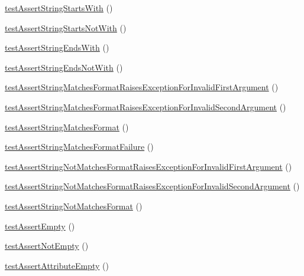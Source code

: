 \begin{DoxyCompactItemize}
\item 
\mbox{\hyperlink{class_framework___assert_test_a7d29d1df44885e798318e63969d1c641}{test\+Assert\+String\+Starts\+With}} ()
\item 
\mbox{\hyperlink{class_framework___assert_test_a78bd8e91d4107a55c53d96343f54780f}{test\+Assert\+String\+Starts\+Not\+With}} ()
\item 
\mbox{\hyperlink{class_framework___assert_test_ab0f2497729bc21b4f7c3b5fb893cfe00}{test\+Assert\+String\+Ends\+With}} ()
\item 
\mbox{\hyperlink{class_framework___assert_test_ad4c2782c2bafb3fdfa97ca4935772844}{test\+Assert\+String\+Ends\+Not\+With}} ()
\item 
\mbox{\hyperlink{class_framework___assert_test_a7b533de2baf506431848208788821702}{test\+Assert\+String\+Matches\+Format\+Raises\+Exception\+For\+Invalid\+First\+Argument}} ()
\item 
\mbox{\hyperlink{class_framework___assert_test_aa71b27deb1167ac44665bb6a043e0dc6}{test\+Assert\+String\+Matches\+Format\+Raises\+Exception\+For\+Invalid\+Second\+Argument}} ()
\item 
\mbox{\hyperlink{class_framework___assert_test_a9b2db252f130a595084a01c466e571cd}{test\+Assert\+String\+Matches\+Format}} ()
\item 
\mbox{\hyperlink{class_framework___assert_test_a1d7a1814c0df462785d13c5db7ace6eb}{test\+Assert\+String\+Matches\+Format\+Failure}} ()
\item 
\mbox{\hyperlink{class_framework___assert_test_addb43c3865838663c7c43c62f0176f72}{test\+Assert\+String\+Not\+Matches\+Format\+Raises\+Exception\+For\+Invalid\+First\+Argument}} ()
\item 
\mbox{\hyperlink{class_framework___assert_test_ad527a862ec3a33f05a6a1caf03a3c30e}{test\+Assert\+String\+Not\+Matches\+Format\+Raises\+Exception\+For\+Invalid\+Second\+Argument}} ()
\item 
\mbox{\hyperlink{class_framework___assert_test_a2b872edc9a0f207ca7bc06f1f46c81e5}{test\+Assert\+String\+Not\+Matches\+Format}} ()
\item 
\mbox{\hyperlink{class_framework___assert_test_ab01e68e8c9d98ffbae4064add0e725b2}{test\+Assert\+Empty}} ()
\item 
\mbox{\hyperlink{class_framework___assert_test_ac14ac3a143df96f3109cffef3b4822b9}{test\+Assert\+Not\+Empty}} ()
\item 
\mbox{\hyperlink{class_framework___assert_test_a5effc6f328a85eff318cde0ad91e5ea7}{test\+Assert\+Attribute\+Empty}} ()
\item 

\end{DoxyCompactItemize}
